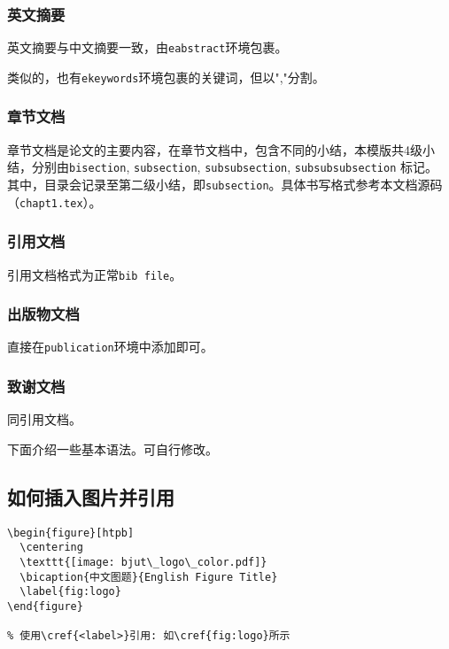 \subsubsection{英文摘要}

 英文摘要与中文摘要一致，由\verb|eabstract|环境包裹。

 类似的，也有\verb|ekeywords|环境包裹的关键词，但以","分割。

 \subsubsection{章节文档}
 章节文档是论文的主要内容，在章节文档中，包含不同的小结，本模版共4级小结，分别由\verb|bisection|, \verb|subsection|, \verb|subsubsection|,  \verb|subsubsubsection| 标记。
 其中，目录会记录至第二级小结，即\verb|subsection|。具体书写格式参考本文档源码（\verb|chapt1.tex|）。

\subsubsection{引用文档}

引用文档格式为正常\verb|bib file|。

\subsubsection{出版物文档}

直接在\verb|publication|环境中添加即可。

\subsubsection{致谢文档}

同引用文档。

下面介绍一些基本语法。可自行修改。
\subsection{如何插入图片并引用}

\begin{center}
  \begin{minipage}{0.95\textwidth}
    \begin{Verbatim}[frame=single]
\begin{figure}[htpb]
  \centering
  \texttt{[image: bjut\_logo\_color.pdf]}
  \bicaption{中文图题}{English Figure Title}
  \label{fig:logo}
\end{figure}

% 使用\cref{<label>}引用: 如\cref{fig:logo}所示
    \end{Verbatim}
  \end{minipage}
\end{center}

